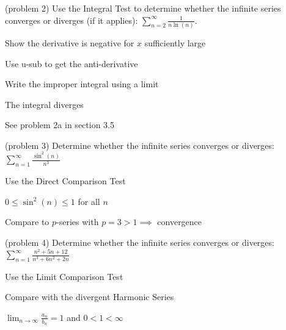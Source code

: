 \documentclass[handout]{ximera}
\begin{document}
\begin{problem}(problem 2)
Use the Integral Test to determine whether the infinite series converges or diverges (if it applies):
$\displaystyle \sum_{n=2}^\infty \frac{1}{n\ln(n)}$.

\begin{hint}
Show the derivative is negative for $x$ sufficiently large
\end{hint}
\begin{hint}
Use u-sub to get the anti-derivative
\end{hint}
\begin{hint}
Write the improper integral using a limit
\end{hint}\begin{hint}
The integral diverges
\end{hint}
\begin{hint}
See problem 2a in section 3.5
\end{hint}
\end{problem}


\begin{problem}(problem 3)
Determine whether the infinite series converges or diverges: 
$\displaystyle \sum_{n=1}^\infty \frac{\sin^2(n)}{n^3}$

\begin{hint}
Use the Direct Comparison Test
\end{hint}

\begin{hint}
$\displaystyle 0 \leq \sin^2(n) \leq 1$ for all $n$
\end{hint}

\begin{hint}
Compare to $p$-series with $p = 3 > 1 \implies$ convergence
\end{hint}

\end{problem}

\begin{problem}(problem 4)
Determine whether the infinite series converges or diverges: 
$\displaystyle \sum_{n=1}^\infty \frac{n^2 + 5n + 12}{n^3 + 6n^2 + 2n}$
\begin{hint}
Use the Limit Comparison Test 
\end{hint}

\begin{hint}
Compare with the divergent Harmonic Series 
\end{hint}

\begin{hint}
$\displaystyle \lim_{n \to \infty} \frac{a_n}{b_n} = 1$ and $ 0 < 1 < \infty$
\end{hint}

\end{problem}
\end{document}

